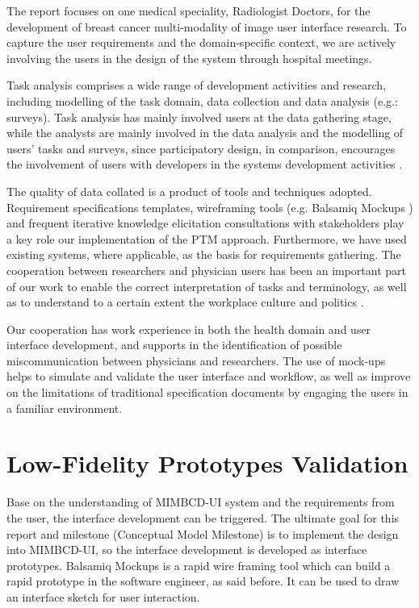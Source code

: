 The report focuses on one medical speciality, Radiologist Doctors, for the development of breast cancer multi-modality of image user interface research. To capture the user requirements and the domain-specific context, we are actively involving the users in the design of the system through hospital meetings.

Task analysis comprises a wide range of development activities and research, including modelling of the task domain, data collection and data analysis (e.g.: surveys). Task analysis has mainly involved users at the data gathering stage, while the analysts are mainly involved in the data analysis and the modelling of users’ tasks and surveys, since participatory design, in comparison, encourages the involvement of users with developers in the systems development activities \cite{muller1993taxonomy}.

The quality of data collated is a product of tools and techniques adopted. Requirement specifications templates, wireframing tools (e.g. Balsamiq Mockups \cite{balsamiqMockups}) and frequent iterative knowledge elicitation consultations with stakeholders play a key role our implementation of the PTM approach. Furthermore, we have used existing systems, where applicable, as the basis for requirements gathering. The cooperation between researchers and physician users has been an important part of our work to enable the correct interpretation of tasks and terminology, as well as to understand to a certain extent the workplace culture and politics \cite{williams1993translation}.

Our cooperation has work experience in both the health domain and user interface development, and supports in the identification of possible miscommunication between physicians and researchers. The use of mock-ups helps to simulate and validate the user interface and workflow, as well as improve on the limitations of traditional specification documents by engaging the users in a familiar environment.

\clearpage

\section{Low-Fidelity Prototypes Validation}

Base on the understanding of MIMBCD-UI system and the requirements from the user, the interface development can be triggered. The ultimate goal for this report and milestone (Conceptual Model Milestone) is to implement the design into MIMBCD-UI, so the interface development is developed as interface prototypes. Balsamiq Mockups \cite{Balsamiq} is a rapid wire framing tool which can build a rapid prototype in the software engineer, as said before. It can be used to draw an interface sketch for user interaction.

